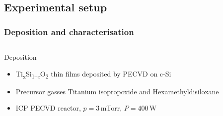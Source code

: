 \documentclass[noamsthm,8pt,t,xcolor={dvipsnames}]{beamer}
\def\TiSiO{Ti\textsubscript{x}Si\textsubscript{1--\itshape x}O\textsubscript{2}}
\begin{document}
\subsection{Experimental setup}

\begin{frame}
   \frametitle{Deposition and characterisation}

   \begin{columns}
      \begin{column}{0.5\textwidth}
         Deposition
         \begin{itemize}
         \item \TiSiO{} thin films deposited by PECVD on c-Si
         \item Precursor gasses Titanium isopropoxide and Hexamethyldisiloxane
         \item<2-> ICP PECVD reactor, $p = 3$\,mTorr, $P = 400$\,W
      \end{itemize}
      \end{column}
      \begin{column}{0.5\textwidth}
\end{column}
\end{columns}
\end{frame}
\end{document}
